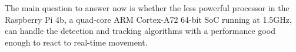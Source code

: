 The main question to answer now is whether the less powerful processor in the Raspberry Pi 4b, a quad-core ARM Cortex-A72 64-bit SoC running at 1.5GHz, can handle the detection and tracking algorithms with a performance good enough to react to real-time movement.

